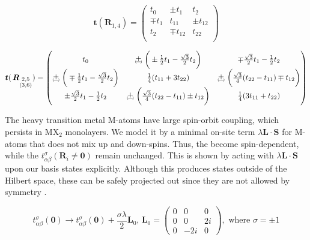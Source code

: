 \begin{equation}
\bm t ( \bm R_{1, 4} ) =
\begin{pmatrix}
t_0 & \pm t_1 & t_2 \\
\mp t_1 & t_{11} & \pm t_{12} \\
t_2 & \mp t_{12} & t_{22} \\
\end{pmatrix}
\end{equation}

\begin{equation}
\bm t (\, \bm R_{\substack{2, 5 \\ (3, 6)}} ) =
\begin{pmatrix}
t_0 & \Pm \bigg( \pm \frac{1}{2} t_1 - \frac{\sqrt{3}}{2} t_2 \bigg) & \mp \frac{\sqrt{3}}{2} t_1 - \frac{1}{2} t_2 \\
\Pm \bigg( \mp \frac{1}{2} t_1 - \frac{\sqrt{3}}{2} t_2 \bigg) & \frac{1}{4} ( t_{11} + 3 t_{22} ) & \Pm \bigg( \frac{\sqrt{3}}{4} ( t_{22} - t_{11} ) \mp t_{12} \bigg) \\
\pm \frac{\sqrt{3}}{2} t_1 - \frac{1}{2} t_2 & \Pm \bigg( \frac{\sqrt{3}}{4} ( t_{22} - t_{11} ) \pm t_{12} \bigg) & \frac{1}{4} ( 3 t_{11} + t_{22} )
\end{pmatrix}
\end{equation}

The heavy transition metal $\text{M}$-atoms have large spin-orbit coupling, which persists in $\text{M}\text{X}_2$ monolayers.
We model it by a minimal on-site term $\lambda \bm L \cdot \bm S$ for $\text{M}$-atoms that does not mix up and down-spins.
Thus, the  become spin-dependent, while the $t_{\alpha \beta}^\sigma ( \bm R_i \neq \bm 0 ) $ remain unchanged.
This is shown by acting with $\lambda \bm L \cdot \bm S$ upon our basis states explicitly.
Although this produces states outside of the Hilbert space, these can be safely projected out since they are not allowed by symmetry \cite{liu_three-band_2013,braz_electronic_2015}.

\begin{equation}
t_{\alpha \beta}^\sigma ( \bm 0 ) \rightarrow t_{\alpha \beta}^\sigma ( \bm 0 ) + \frac{\sigma \lambda}{2} \bm L_0 , \, \bm L_0 =
\begin{pmatrix}
0 & 0 & 0 \\
0 & 0 & 2i \\
0 & -2i & 0 
\end{pmatrix}
, \,\, \text{where} \,\,  \sigma = \pm 1
\end{equation}

